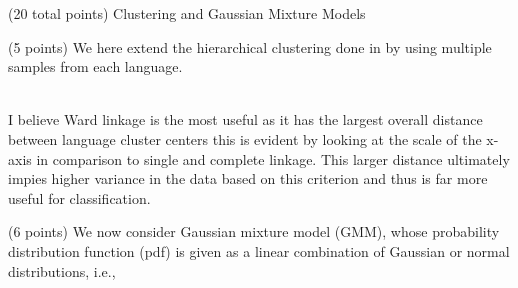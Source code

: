 \documentclass[12pt]{article}
\begin{document}
\begin{question}{(20 total points) Clustering and Gaussian Mixture Models}
\begin{subquestion}{(5 points)
       We here extend the hierarchical clustering done in  by
       using multiple samples from each language.
     }
\begin{answerbox}{54em}
{\\
        I believe Ward linkage is the most useful as it has the largest overall distance between language cluster centers this is evident by looking at the scale of the x-axis in comparison to single and complete linkage. This larger distance ultimately impies higher variance in the data based on this criterion and thus is far more useful for classification.
        } 
      \end{answerbox}
  


   \end{subquestion}
   \begin{subquestion}{(6 points)
       We now consider Gaussian mixture model (GMM), whose
       probability distribution function (pdf) is given as
       a linear combination of Gaussian or normal distributions, i.e.,
     } \label{Q3.5}





\end{subquestion}
\end{question}
\end{document}
